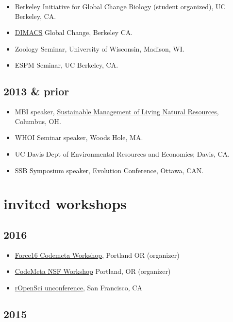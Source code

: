 \documentclass[11pt,a4paper,sans]{moderncv}        %
\providecommand{\tightlist}{%
    \setlength{\itemsep}{0pt}\setlength{\parskip}{0pt}}
\begin{document}
\begin{itemize}
\tightlist
\item
  Berkeley Initiative for Global Change Biology (student organized), UC
  Berkeley, CA.
\item
  \href{http://dimacs.rutgers.edu/Workshops/GlobalChange/announcement.html}{DIMACS}
  Global Change, Berkeley CA.
\item
  Zoology Seminar, University of Wisconsin, Madison, WI.
\item
  ESPM Seminar, UC Berkeley, CA.
\end{itemize}

\subsection{2013 \& prior}\label{prior}

\begin{itemize}
\tightlist
\item
  MBI speaker,
  \href{http://www.mbi.ohio-state.edu/2013/ws3description.html}{Sustainable
  Management of Living Natural Resources}, Columbus, OH.
\item
  WHOI Seminar speaker, Woods Hole, MA.
\item
  UC Davis Dept of Environmental Resources and Economics; Davis, CA.
\item
  SSB Symposium speaker, Evolution Conference, Ottawa, CAN.
\end{itemize}

\section{invited workshops}\label{invited-workshops}

\subsection{2016}\label{section-2}

\begin{itemize}
\tightlist
\item
  \href{http://sched.co/5wK5}{Force16 Codemeta Workshop}, Portland OR
  (organizer)
\item
  \href{https://codemeta.github.io}{CodeMeta NSF Workshop} Portland, OR
  (organizer)
\item
  \href{http://unconf16.ropensci.org}{rOpenSci unconference}, San
  Francisco, CA
\end{itemize}

\subsection{2015}\label{section-3}
\end{document}
